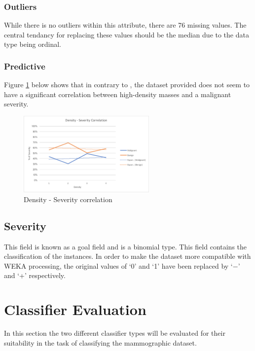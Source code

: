 \documentclass[12pt]{article}
\begin{document}
      \subsubsection{Outliers}
        While there is no outliers within this attribute, there are 76 missing values. The central tendancy for replacing these values should be the median due to the data type being ordinal.

      \subsubsection{Predictive}
        Figure \ref{fig:density-severity-correlation} below shows that in contrary to \cite{woods2011mammographic}, the dataset provided does not seem to have a significant correlation between high-density masses and a malignant severity.

        \begin{figure}[H]
          \centering
          \includegraphics[width=0.6\textwidth]{density-severity-correlation}
          \caption{Density - Severity correlation}
          \label{fig:density-severity-correlation}
        \end{figure}

    \subsection{Severity}
      This field is known as a goal field and is a binomial type. This field contains the classification of the instances. In order to make the dataset more compatible with WEKA processing, the original values of ‘0’ and ‘1’ have been replaced by ‘$-$’ and ‘+’ respectively.

\section{Classifier Evaluation}
  In this section the two different classifier types will be evaluated for their suitability in the task of classifying the mammographic dataset.
\end{document}
